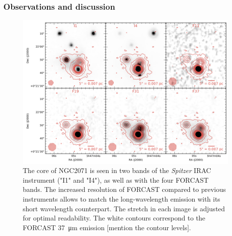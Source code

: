 \subsubsection{Observations and discussion}

\begin{landscape}
\begin{figure}
\begin{center}
\includegraphics[width=1.4\textwidth]{Figures/NGC2071_mosaic.png}


\caption[Multi-wavelength view of the NGC~2071 core]{The core of NGC2071 is seen in two bands of the \textit{Spitzer} IRAC instrument ("I1" and "I4"), as well as with the four FORCAST bands. The increased resolution of FORCAST compared to previous instruments allows to match the long-wavelength emission with its short wavelength counterpart. The stretch in each image is adjusted for optimal readability. The white contours correspond to the FORCAST \SI{37}{\micro\meter} emission [mention the contour levels]. }
\label{fig:NGC2071_mosaic}
\end{center}
\end{figure}
\end{landscape}


